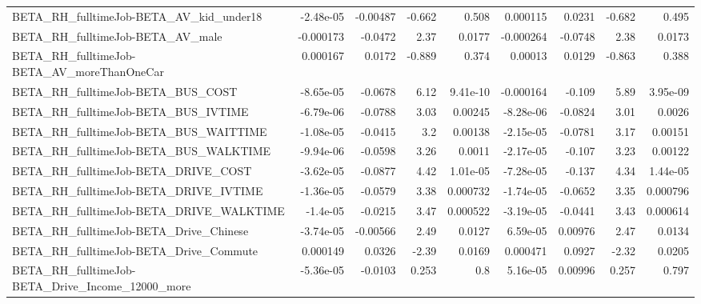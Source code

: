 \begin{tabular}{lrrrrrrrr}
BETA\_RH\_fulltimeJob-BETA\_AV\_kid\_under18            &   -2.48e-05 &     -0.00487 &    -0.662 &    0.508 &   0.000115 &      0.0231 &       -0.682 &         0.495 \\
BETA\_RH\_fulltimeJob-BETA\_AV\_male                   &   -0.000173 &      -0.0472 &      2.37 &   0.0177 &  -0.000264 &     -0.0748 &         2.38 &        0.0173 \\
BETA\_RH\_fulltimeJob-BETA\_AV\_moreThanOneCar         &    0.000167 &       0.0172 &    -0.889 &    0.374 &    0.00013 &      0.0129 &       -0.863 &         0.388 \\
BETA\_RH\_fulltimeJob-BETA\_BUS\_COST                  &   -8.65e-05 &      -0.0678 &      6.12 & 9.41e-10 &  -0.000164 &      -0.109 &         5.89 &      3.95e-09 \\
BETA\_RH\_fulltimeJob-BETA\_BUS\_IVTIME                &   -6.79e-06 &      -0.0788 &      3.03 &  0.00245 &  -8.28e-06 &     -0.0824 &         3.01 &        0.0026 \\
BETA\_RH\_fulltimeJob-BETA\_BUS\_WAITTIME              &   -1.08e-05 &      -0.0415 &       3.2 &  0.00138 &  -2.15e-05 &     -0.0781 &         3.17 &       0.00151 \\
BETA\_RH\_fulltimeJob-BETA\_BUS\_WALKTIME              &   -9.94e-06 &      -0.0598 &      3.26 &   0.0011 &  -2.17e-05 &      -0.107 &         3.23 &       0.00122 \\
BETA\_RH\_fulltimeJob-BETA\_DRIVE\_COST                &   -3.62e-05 &      -0.0877 &      4.42 & 1.01e-05 &  -7.28e-05 &      -0.137 &         4.34 &      1.44e-05 \\
BETA\_RH\_fulltimeJob-BETA\_DRIVE\_IVTIME              &   -1.36e-05 &      -0.0579 &      3.38 & 0.000732 &  -1.74e-05 &     -0.0652 &         3.35 &      0.000796 \\
BETA\_RH\_fulltimeJob-BETA\_DRIVE\_WALKTIME            &    -1.4e-05 &      -0.0215 &      3.47 & 0.000522 &  -3.19e-05 &     -0.0441 &         3.43 &      0.000614 \\
BETA\_RH\_fulltimeJob-BETA\_Drive\_Chinese             &   -3.74e-05 &     -0.00566 &      2.49 &   0.0127 &   6.59e-05 &     0.00976 &         2.47 &        0.0134 \\
BETA\_RH\_fulltimeJob-BETA\_Drive\_Commute             &    0.000149 &       0.0326 &     -2.39 &   0.0169 &   0.000471 &      0.0927 &        -2.32 &        0.0205 \\
BETA\_RH\_fulltimeJob-BETA\_Drive\_Income\_12000\_more   &   -5.36e-05 &      -0.0103 &     0.253 &      0.8 &   5.16e-05 &     0.00996 &        0.257 &         0.797 \\

\end{tabular}
